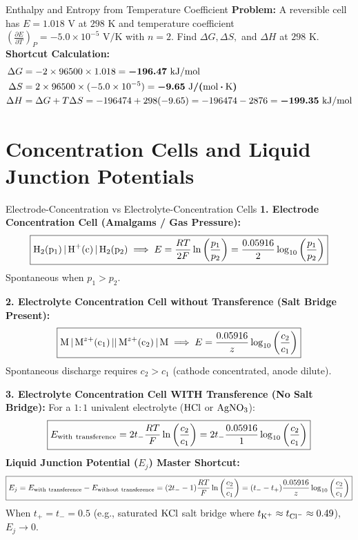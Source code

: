 \documentclass[11pt,a4paper]{report}
\newcommand{\ans}[1]{\ifmmode\bm{#1}\else\textbf{#1}\fi}
\begin{document}
\begin{microbox}{Enthalpy and Entropy from Temperature Coefficient}
\textbf{Problem:} A reversible cell has $E = 1.018\text{ V}$ at $298\text{ K}$ and temperature coefficient $\left(\frac{\partial E}{\partial T}\right)_P = -5.0 \times 10^{-5}\text{ V/K}$ with $n = 2$. Find $\Delta G, \Delta S,$ and $\Delta H$ at $298\text{ K}$.\\
\textbf{Shortcut Calculation:}
\begin{align*}
\Delta G &= -2 \times 96500 \times 1.018 = \ans{-196.47\text{ kJ/mol}} \\
\Delta S &= 2 \times 96500 \times (-5.0 \times 10^{-5}) = \ans{-9.65\text{ J}/(\text{mol}\cdot\text{K})} \\
\Delta H &= \Delta G + T \Delta S = -196474 + 298(-9.65) = -196474 - 2876 = \ans{-199.35\text{ kJ/mol}}
\end{align*}
\end{microbox}

\chapter{Concentration Cells and Liquid Junction Potentials}

\begin{shortcutbox}{Electrode-Concentration vs Electrolyte-Concentration Cells}
\textbf{1. Electrode Concentration Cell (Amalgams / Gas Pressure):}
\begin{equation}
\boxed{
\ce{H2(p_1) | H+(c) | H2(p_2)} \implies E = \frac{RT}{2F}\ln\left(\frac{p_1}{p_2}\right) = \frac{0.05916}{2}\log_{10}\left(\frac{p_1}{p_2}\right)
}
\end{equation}
Spontaneous when $p_1 > p_2$.

\textbf{2. Electrolyte Concentration Cell without Transference (Salt Bridge Present):}
\begin{equation}
\boxed{
\ce{M | M^{z+}(c_1) || M^{z+}(c_2) | M} \implies E = \frac{0.05916}{z}\log_{10}\left(\frac{c_2}{c_1}\right)
}
\end{equation}
Spontaneous discharge requires $c_2 > c_1$ (cathode concentrated, anode dilute).

\textbf{3. Electrolyte Concentration Cell WITH Transference (No Salt Bridge):}
For a $1:1$ univalent electrolyte ($\ce{HCl}$ or $\ce{AgNO3}$):
\begin{equation}
\boxed{
E_{\rm with\ transference} = 2 t_- \frac{RT}{F}\ln\left(\frac{c_2}{c_1}\right) = 2 t_- \frac{0.05916}{1}\log_{10}\left(\frac{c_2}{c_1}\right)
}
\end{equation}
\textbf{Liquid Junction Potential ($E_j$) Master Shortcut:}
\begin{equation}
\boxed{
E_j = E_{\rm with\ transference} - E_{\rm without\ transference} = (2 t_- - 1)\frac{RT}{F}\ln\left(\frac{c_2}{c_1}\right) = (t_- - t_+)\frac{0.05916}{z}\log_{10}\left(\frac{c_2}{c_1}\right)
}
\end{equation}
When $t_+ = t_- = 0.5$ (e.g., saturated $\ce{KCl}$ salt bridge where $t_{\ce{K+}} \approx t_{\ce{Cl-}} \approx 0.49$), $E_j \to 0$.
\end{shortcutbox}
\end{document}
